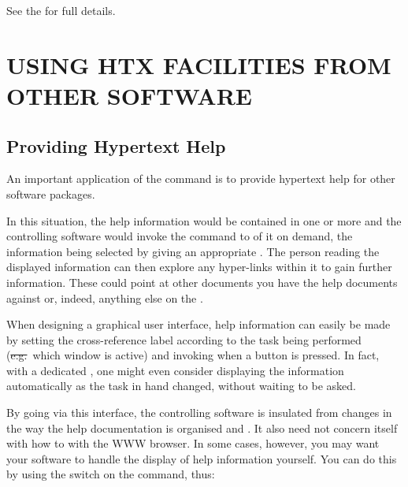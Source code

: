 See the 
for full details.

\section{USING HTX FACILITIES FROM OTHER SOFTWARE}

\subsection{\label{sect:hypertexthelp}Providing Hypertext Help}

An important application of the  command is to
provide hypertext help for other software packages.

In this situation, the help information would be contained in one or
more  and the
controlling software would invoke the  command to
 of it on
demand, the information being selected by giving an appropriate
.
The person reading the displayed information can then explore any hyper-links
within it to gain further information. These could point at other
documents you have  the help
documents against or, indeed, anything else on the .

When designing a graphical user interface, help information can easily
be made  by setting the cross-reference label
according to the task being performed (\st{e.g.}\ which window is
active) and invoking  when a  button is
pressed. In fact, with a dedicated , one might even consider displaying
the information automatically as the task in hand changed, without
waiting to be asked.

By going via this  interface, the controlling
software is insulated from changes in the way the help documentation
is organised and . It also need not
concern itself with how to
 with the WWW
browser. \label{text:gettingdocumenturls}In some cases, however, you
may want your software to handle the display of help information
yourself. You can do this by using the  switch on the
 command, thus:

